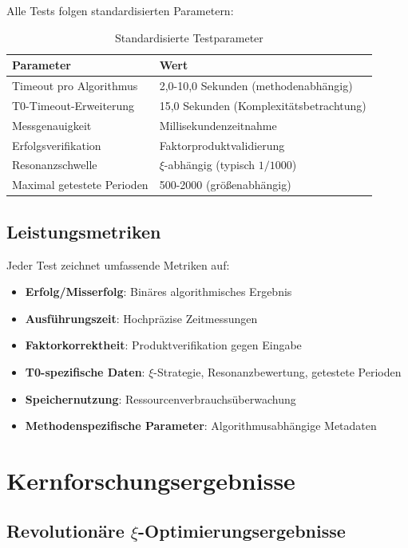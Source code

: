 	Alle Tests folgen standardisierten Parametern:
	\begin{table}[H]
		\centering
		\caption{Standardisierte Testparameter}
		\begin{tabular}{ll}
			\toprule
			\textbf{Parameter} & \textbf{Wert} \\
			\midrule
			Timeout pro Algorithmus & 2,0-10,0 Sekunden (methodenabhängig) \\
			T0-Timeout-Erweiterung & 15,0 Sekunden (Komplexitätsbetrachtung) \\
			Messgenauigkeit & Millisekundenzeitnahme \\
			Erfolgsverifikation & Faktorproduktvalidierung \\
			Resonanzschwelle & $\xi$-abhängig (typisch $1/1000$) \\
			Maximal getestete Perioden & 500-2000 (größenabhängig) \\
			\bottomrule
		\end{tabular}
	\end{table}
	
	\subsection{Leistungsmetriken}
	
	Jeder Test zeichnet umfassende Metriken auf:
	\begin{itemize}
		\item \textbf{Erfolg/Misserfolg}: Binäres algorithmisches Ergebnis
		\item \textbf{Ausführungszeit}: Hochpräzise Zeitmessungen
		\item \textbf{Faktorkorrektheit}: Produktverifikation gegen Eingabe
		\item \textbf{T0-spezifische Daten}: $\xi$-Strategie, Resonanzbewertung, getestete Perioden
		\item \textbf{Speichernutzung}: Ressourcenverbrauchsüberwachung
		\item \textbf{Methodenspezifische Parameter}: Algorithmusabhängige Metadaten
	\end{itemize}
	
	\section{Kernforschungsergebnisse}
	
	\subsection{Revolutionäre $\xi$-Optimierungsergebnisse}
	
